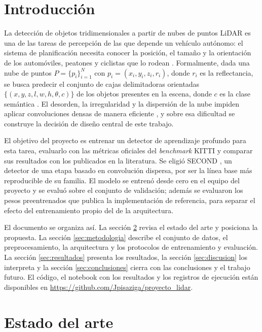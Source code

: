 \documentclass[11pt,letterpaper]{article}
\begin{document}
\section{Introducción}

La detección de objetos tridimensionales a partir de nubes de puntos LiDAR es una de las tareas de percepción de las que depende un vehículo autónomo: el sistema de planificación necesita conocer la posición, el tamaño y la orientación de los automóviles, peatones y ciclistas que lo rodean \cite{qian2022, cai2025}. Formalmente, dada una nube de puntos $P = \{p_i\}_{i=1}^{N}$ con $p_i = (x_i, y_i, z_i, r_i)$, donde $r_i$ es la reflectancia, se busca predecir el conjunto de cajas delimitadoras orientadas $\{(x, y, z, l, w, h, \theta, c)\}$ de los objetos presentes en la escena, donde $c$ es la clase semántica \cite{geiger2013}. El desorden, la irregularidad y la dispersión de la nube impiden aplicar convoluciones densas de manera eficiente \cite{guo2021, li2021}, y sobre esa dificultad se construye la decisión de diseño central de este trabajo.

El objetivo del proyecto es entrenar un detector de aprendizaje profundo para esta tarea, evaluarlo con las métricas oficiales del \textit{benchmark} KITTI \cite{geiger2013} y comparar sus resultados con los publicados en la literatura. Se eligió SECOND \cite{yan2018}, un detector de una etapa basado en convolución dispersa, por ser la línea base más reproducible de su familia. El modelo se entrenó desde cero en el equipo del proyecto y se evaluó sobre el conjunto de validación; además se evaluaron los pesos preentrenados que publica la implementación de referencia, para separar el efecto del entrenamiento propio del de la arquitectura.

El documento se organiza así. La sección \ref{sec:estado} revisa el estado del arte y posiciona la propuesta. La sección \ref{sec:metodologia} describe el conjunto de datos, el preprocesamiento, la arquitectura y los protocolos de entrenamiento y evaluación. La sección \ref{sec:resultados} presenta los resultados, la sección \ref{sec:discusion} los interpreta y la sección \ref{sec:conclusiones} cierra con las conclusiones y el trabajo futuro. El código, el notebook con los resultados y los registros de ejecución están disponibles en \url{https://github.com/Jpisaziga/proyecto_lidar}.

\section{Estado del arte}
\label{sec:estado}
\end{document}
